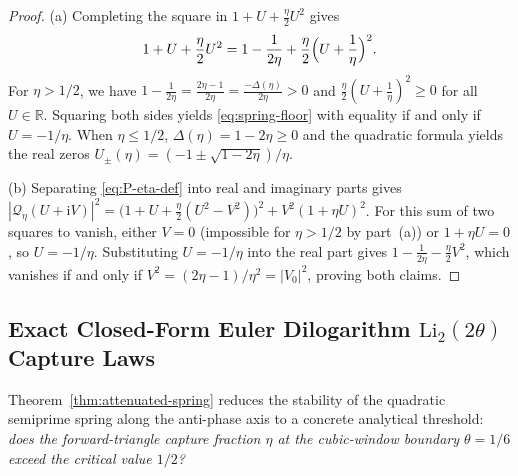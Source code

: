\documentclass[11pt,reqno]{amsart}
\theoremstyle{definition}
\theoremstyle{remark}
\numberwithin{equation}{section}
\newcommand{\ii}{\mathrm{i}}
\begin{document}
\begin{proof}
(a) Completing the square in $1 + U + \frac{\eta}{2}U^2$ gives
\[
1 + U + \frac{\eta}{2}U^2 = 1 - \frac{1}{2\eta} + \frac{\eta}{2}\Bigl(U + \frac{1}{\eta}\Bigr)^2.
\]
For $\eta > 1/2$, we have $1 - \frac{1}{2\eta} = \frac{2\eta - 1}{2\eta} = \frac{-\Delta(\eta)}{2\eta} > 0$ and $\frac{\eta}{2}(U + \frac{1}{\eta})^2 \ge 0$ for all $U \in \mathbb{R}$. Squaring both sides yields \eqref{eq:spring-floor} with equality if and only if $U = -1/\eta$. When $\eta \le 1/2$, $\Delta(\eta) = 1 - 2\eta \ge 0$ and the quadratic formula yields the real zeros $U_\pm(\eta) = (-1 \pm \sqrt{1-2\eta})/\eta$.

(b) Separating \eqref{eq:P-eta-def} into real and imaginary parts gives $|\mathcal{Q}_\eta(U+\ii V)|^2 = \bigl(1 + U + \frac{\eta}{2}(U^2-V^2)\bigr)^2 + V^2(1 + \eta U)^2$. For this sum of two squares to vanish, either $V=0$ (impossible for $\eta > 1/2$ by part~(a)) or $1 + \eta U = 0$, so $U = -1/\eta$. Substituting $U = -1/\eta$ into the real part gives $1 - \frac{1}{2\eta} - \frac{\eta}{2}V^2$, which vanishes if and only if $V^2 = (2\eta - 1)/\eta^2 = |V_0|^2$, proving both claims.
\end{proof}

\subsection{Exact Closed-Form Euler Dilogarithm \texorpdfstring{$\mathrm{Li}_2(2\theta)$}{Li2(2theta)} Capture Laws}\label{subsec:dilogarithm-laws}

Theorem~\ref{thm:attenuated-spring} reduces the stability of the quadratic semiprime spring along the anti-phase axis to a concrete analytical threshold: \emph{does the forward-triangle capture fraction $\eta$ at the cubic-window boundary $\theta = 1/6$ exceed the critical value $1/2$?}
\end{document}
